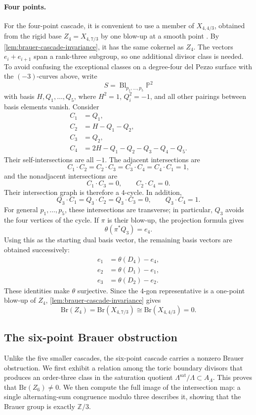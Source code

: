 \documentclass[11pt]{article}
\theoremstyle{plain}
\theoremstyle{definition}
\theoremstyle{remark}
\newcommand{\Pp}{\mathbb P}
\newcommand{\Z}{\mathbb Z}
\newcommand{\Bl}{\operatorname{Bl}}
\newcommand{\Br}{\mathrm{Br}}
\begin{document}
\paragraph{Four points.}
For the four-point cascade, it is convenient to use a member of \(X_{4,4/3}\), obtained from the
rigid base \(Z_4=X_{4,7/3}\) by one blow-up at a smooth point
\cite[Corollary~8]{Corti2016}. By \cref{lem:brauer-cascade-invariance},
it has the same cokernel as \(Z_4\). The vectors \(e_i+e_{i+1}\) span a
rank-three subgroup, so one additional divisor class is needed. To avoid
confusing the exceptional classes on a degree-four del Pezzo surface with the
\((-3)\)-curves above, write
\[
S=\Bl_{p_1,\dots,p_5}\Pp^2
\]
with basis \(H,Q_1,\dots,Q_5\), where \(H^2=1\), \(Q_i^2=-1\), and all
other pairings between basis elements vanish. Consider
\[
\begin{aligned}
C_1&=Q_1,\\
C_2&=H-Q_1-Q_2,\\
C_3&=Q_2,\\
C_4&=2H-Q_1-Q_2-Q_3-Q_4-Q_5.
\end{aligned}
\]
Their self-intersections are all \(-1\). The adjacent intersections are
\[
C_1\cdot C_2=C_2\cdot C_3=C_3\cdot C_4=C_4\cdot C_1=1,
\]
and the nonadjacent intersections are
\[
C_1\cdot C_3=0,
\qquad
C_2\cdot C_4=0.
\]
Their intersection graph is therefore a \(4\)-cycle. In addition,
\[
Q_3\cdot C_1=Q_3\cdot C_2=Q_3\cdot C_3=0,
\qquad
Q_3\cdot C_4=1.
\]
For general \(p_1,\dots,p_5\), these intersections are transverse; in
particular, \(Q_3\) avoids the four vertices of the cycle. If \(\pi\) is their
blow-up, the projection formula gives
\[
\theta(\pi^*Q_3)=e_4.
\]
Using this as the starting dual basis vector, the remaining basis vectors are
obtained successively:
\[
\begin{aligned}
e_1&=\theta(D_4)-e_4,\\
e_2&=\theta(D_1)-e_1,\\
e_3&=\theta(D_2)-e_2.
\end{aligned}
\]
These identities make \(\theta\) surjective. Since the \(4\)-gon representative
is a one-point blow-up of \(Z_4\),
\cref{lem:brauer-cascade-invariance} gives
\[
\Br(Z_4)=\Br(X_{4,7/3})\cong\Br(X_{4,4/3})=0.
\]

\subsection{The six-point Brauer obstruction}
\label{app:brauer-six}

Unlike the five smaller cascades, the six-point cascade carries a
nonzero Brauer obstruction. We first exhibit a relation among the toric
boundary divisors that produces an order-three class in the saturation quotient
\(\Lambda^{\mathrm{sat}}/\Lambda\subset A_\Lambda\). This proves
that \(\Br(Z_6)\ne0\). We then compute
the full image of the intersection map: a single alternating-sum
congruence modulo three describes it, showing that the Brauer group is
exactly \(\Z/3\).
\end{document}
